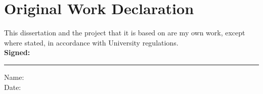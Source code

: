 \chapter*{Original Work Declaration}

This dissertation and the project that it is based on are my own work, except where stated, in accordance with University regulations.
\\ \newline \newline
\textbf{Signed:}
\hrule width 0.5\textwidth
\vspace{6pt}
\noindent
Name: 
\\
Date:
\\